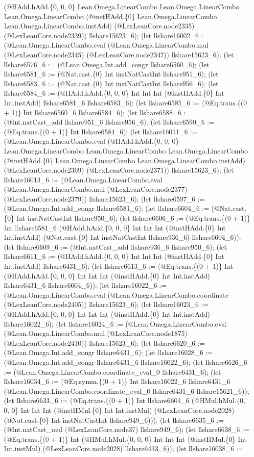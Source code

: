 \documentclass[11pt]{article}
\begin{document}
(@HAdd.hAdd.\{0, 0, 0\} Lean.Omega.LinearCombo Lean.Omega.LinearCombo Lean.Omega.LinearCombo (@instHAdd.\{0\} Lean.Omega.LinearCombo Lean.Omega.LinearCombo.instAdd) (@LexLeanCore.node2335) (@LexLeanCore.node2339)) llshare15623\_6); (let llshare16002\_6 := (@Lean.Omega.LinearCombo.eval (@Lean.Omega.LinearCombo.mul (@LexLeanCore.node2345) (@LexLeanCore.node2347)) llshare15623\_6); (let llshare6576\_6 := (@Lean.Omega.Int.add\_congr llshare6560\_6); (let llshare6581\_6 := (@Nat.cast.\{0\} Int instNatCastInt llshare951\_6); (let llshare6583\_6 := (@Nat.cast.\{0\} Int instNatCastInt llshare956\_6); (let llshare6584\_6 := (@HAdd.hAdd.\{0, 0, 0\} Int Int Int (@instHAdd.\{0\} Int Int.instAdd) llshare6581\_6 llshare6583\_6); (let llshare6585\_6 := (@Eq.trans.\{(0 + 1)\} Int llshare6560\_6 llshare6584\_6); (let llshare6588\_6 := (@Int.natCast\_add llshare951\_6 llshare956\_6); (let llshare6590\_6 := (@Eq.trans.\{(0 + 1)\} Int llshare6584\_6); (let llshare16011\_6 := (@Lean.Omega.LinearCombo.eval (@HAdd.hAdd.\{0, 0, 0\} Lean.Omega.LinearCombo Lean.Omega.LinearCombo Lean.Omega.LinearCombo (@instHAdd.\{0\} Lean.Omega.LinearCombo Lean.Omega.LinearCombo.instAdd) (@LexLeanCore.node2369) (@LexLeanCore.node2371)) llshare15623\_6); (let llshare16013\_6 := (@Lean.Omega.LinearCombo.eval (@Lean.Omega.LinearCombo.mul (@LexLeanCore.node2377) (@LexLeanCore.node2379)) llshare15623\_6); (let llshare6597\_6 := (@Lean.Omega.Int.add\_congr llshare6581\_6); (let llshare6604\_6 := (@Nat.cast.\{0\} Int instNatCastInt llshare950\_6); (let llshare6606\_6 := (@Eq.trans.\{(0 + 1)\} Int llshare6581\_6 (@HAdd.hAdd.\{0, 0, 0\} Int Int Int (@instHAdd.\{0\} Int Int.instAdd) (@Nat.cast.\{0\} Int instNatCastInt llshare936\_6) llshare6604\_6)); (let llshare6609\_6 := (@Int.natCast\_add llshare936\_6 llshare950\_6); (let llshare6611\_6 := (@HAdd.hAdd.\{0, 0, 0\} Int Int Int (@instHAdd.\{0\} Int Int.instAdd) llshare6431\_6); (let llshare6613\_6 := (@Eq.trans.\{(0 + 1)\} Int (@HAdd.hAdd.\{0, 0, 0\} Int Int Int (@instHAdd.\{0\} Int Int.instAdd) llshare6431\_6 llshare6604\_6)); (let llshare16022\_6 := (@Lean.Omega.LinearCombo.eval (@Lean.Omega.LinearCombo.coordinate (@LexLeanCore.node2405)) llshare15623\_6); (let llshare16023\_6 := (@HAdd.hAdd.\{0, 0, 0\} Int Int Int (@instHAdd.\{0\} Int Int.instAdd) llshare16022\_6); (let llshare16024\_6 := (@Lean.Omega.LinearCombo.eval (@Lean.Omega.LinearCombo.mul (@LexLeanCore.node1875) (@LexLeanCore.node2410)) llshare15623\_6); (let llshare6620\_6 := (@Lean.Omega.Int.add\_congr llshare6431\_6); (let llshare16028\_6 := (@Lean.Omega.Int.add\_congr llshare6431\_6 llshare16022\_6); (let llshare6626\_6 := (@Lean.Omega.LinearCombo.coordinate\_eval\_0 llshare6431\_6); (let llshare16034\_6 := (@Eq.symm.\{(0 + 1)\} Int llshare16022\_6 llshare6431\_6 (@Lean.Omega.LinearCombo.coordinate\_eval\_0 llshare6431\_6 llshare15621\_6)); (let llshare6633\_6 := (@Eq.trans.\{(0 + 1)\} Int llshare6604\_6 (@HMul.hMul.\{0, 0, 0\} Int Int Int (@instHMul.\{0\} Int Int.instMul) (@LexLeanCore.node2028) (@Nat.cast.\{0\} Int instNatCastInt llshare949\_6))); (let llshare6635\_6 := (@Int.natCast\_mul (@LexLeanCore.node37) llshare949\_6); (let llshare6638\_6 := (@Eq.trans.\{(0 + 1)\} Int (@HMul.hMul.\{0, 0, 0\} Int Int Int (@instHMul.\{0\} Int Int.instMul) (@LexLeanCore.node2028) llshare6433\_6)); (let llshare16038\_6 := 
\end{document}
